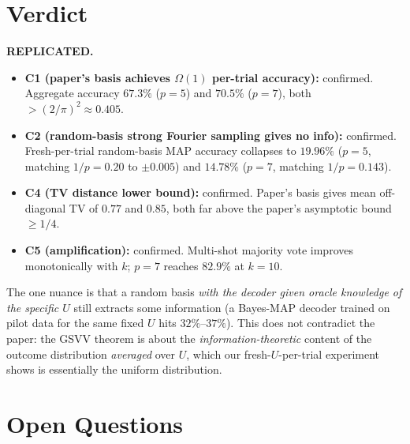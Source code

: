 \documentclass[11pt]{article}
\begin{document}
\section{Verdict}

\textbf{REPLICATED.}

\begin{itemize}
\item \textbf{C1 (paper's basis achieves $\Omega(1)$ per-trial accuracy):}
confirmed. Aggregate accuracy $67.3\%$ ($p=5$) and $70.5\%$ ($p=7$), both
$>(2/\pi)^{2}\!\approx\!0.405$.
\item \textbf{C2 (random-basis strong Fourier sampling gives no info):}
confirmed. Fresh-per-trial random-basis MAP accuracy collapses to $19.96\%$
($p=5$, matching $1/p=0.20$ to $\pm0.005$) and $14.78\%$ ($p=7$, matching
$1/p=0.143$).
\item \textbf{C4 (TV distance lower bound):} confirmed. Paper's basis gives
mean off-diagonal TV of $0.77$ and $0.85$, both far above the paper's
asymptotic bound $\ge 1/4$.
\item \textbf{C5 (amplification):} confirmed. Multi-shot majority vote
improves monotonically with $k$; $p=7$ reaches $82.9\%$ at $k=10$.
\end{itemize}

The one nuance is that a random basis \emph{with the decoder given oracle
knowledge of the specific $U$} still extracts some information (a Bayes-MAP
decoder trained on pilot data for the same fixed $U$ hits $32\%$--$37\%$).
This does not contradict the paper: the GSVV theorem is about the
\emph{information-theoretic} content of the outcome distribution
\emph{averaged} over $U$, which our fresh-$U$-per-trial experiment shows is
essentially the uniform distribution.

\section{Open Questions}
\end{document}
